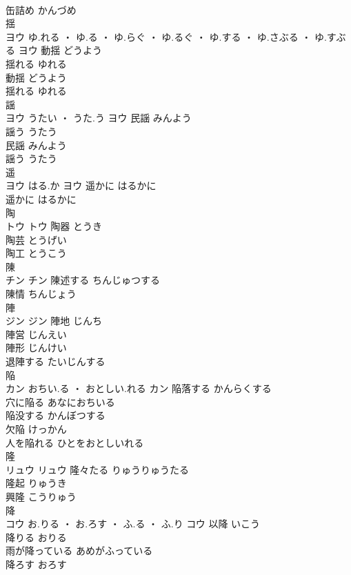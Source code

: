 \documentclass[8pt]{extreport}
\begin{document}
\begin{CJK}{UTF8}{min}
\\	缶詰め	かんづめ	
\\	揺	
\\	ヨウ	ゆ.れる ・ ゆ.る ・ ゆ.らぐ ・ ゆ.るぐ ・ ゆ.する ・ ゆ.さぶる ・ ゆ.すぶる	ヨウ	動揺	どうよう	
\\	揺れる	ゆれる	
\\	動揺	どうよう	
\\	揺れる	ゆれる	
\\	謡	
\\	ヨウ	うたい ・ うた.う	ヨウ	民謡	みんよう	
\\	謡う	うたう	
\\	民謡	みんよう	
\\	謡う	うたう	
\\	遥	
\\	ヨウ	はる.か	ヨウ	遥かに	はるかに	
\\	遥かに	はるかに	
\\	陶	
\\	トウ		トウ	陶器	とうき	
\\	陶芸	とうげい	
\\	陶工	とうこう	
\\	陳	
\\	チン		チン	陳述する	ちんじゅつする	
\\	陳情	ちんじょう	
\\	陣	
\\	ジン		ジン	陣地	じんち	
\\	陣営	じんえい	
\\	陣形	じんけい	
\\	退陣する	たいじんする	
\\	陥	
\\	カン	おちい.る ・ おとしい.れる	カン	陥落する	かんらくする	
\\	穴に陥る	あなにおちいる	
\\	陥没する	かんぼつする	
\\	欠陥	けっかん	
\\	人を陥れる	ひとをおとしいれる	
\\	隆	
\\	リュウ		リュウ	隆々たる	りゅうりゅうたる	
\\	隆起	りゅうき	
\\	興隆	こうりゅう	
\\	降	
\\	コウ	お.りる ・ お.ろす ・ ふ.る ・ ふ.り	コウ	以降	いこう	
\\	降りる	おりる	
\\	雨が降っている	あめがふっている	
\\	降ろす	おろす	

\end{CJK}
\end{document}
